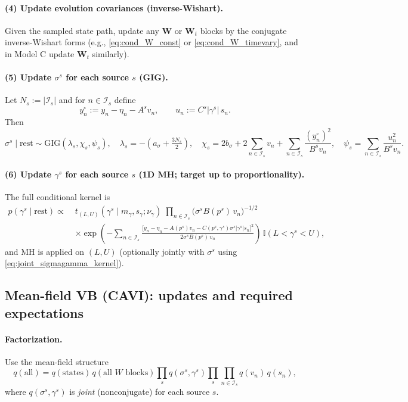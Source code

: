 \documentclass[11pt]{article}
\newcommand{\1}{\mathbb{I}}
\newcommand{\GIG}{\mathrm{GIG}}
\begin{document}
\paragraph{(4) Update evolution covariances (inverse-Wishart).}
Given the sampled state path, update any $\bm W$ or $\bm W_t$ blocks by the conjugate inverse-Wishart forms
(e.g., \eqref{eq:cond_W_const} or \eqref{eq:cond_W_timevary}, and in Model C update $\bm W_t$ similarly).

\paragraph{(5) Update $\sigma^s$ for each source $s$ (GIG).}
Let $N_s:=|\mathcal{I}_s|$ and for $n\in\mathcal{I}_s$ define
\[
y_n^\circ := y_n - \eta_n - A^s v_n,
\qquad
u_n := C^s|\gamma^s|\,s_n.
\]
Then
\begin{equation}
\sigma^s\mid \text{rest} \sim \GIG(\lambda_s,\chi_s,\psi_s),
\quad
\lambda_s=-(a_\sigma+\tfrac{3N_s}{2}),
\quad
\chi_s=2b_\sigma+2\sum_{n\in\mathcal{I}_s} v_n+\sum_{n\in\mathcal{I}_s}\frac{(y_n^\circ)^2}{B^s v_n},
\quad
\psi_s=\sum_{n\in\mathcal{I}_s}\frac{u_n^2}{B^s v_n}.
\label{eq:gibbs_sigma_alg}
\end{equation}

\paragraph{(6) Update $\gamma^s$ for each source $s$ (1D MH; target up to proportionality).}
The full conditional kernel is
\begin{align}
p(\gamma^s\mid \text{rest})
\propto\;&
t_{(L,U)}(\gamma^s\mid m_\gamma,s_\gamma;\nu_\gamma)\;
\prod_{n\in\mathcal{I}_s}\Big(\sigma^s B(p^s)\,v_n\Big)^{-1/2}\nonumber\\
&\times
\exp\!\left(
-\sum_{n\in\mathcal{I}_s}
\frac{\big[y_n-\eta_n-A(p^s)v_n-C(p^s,\gamma^s)\sigma^s|\gamma^s|s_n\big]^2}{2\sigma^s B(p^s)\,v_n}
\right)\,\1(L<\gamma^s<U),
\label{eq:gibbs_gamma_alg}
\end{align}
and MH is applied on $(L,U)$ (optionally jointly with $\sigma^s$ using \eqref{eq:joint_sigmagamma_kernel}).

\subsection{Mean-field VB (CAVI): updates and required expectations}

\paragraph{Factorization.}
Use the mean-field structure
\[
q(\text{all}) = q(\text{states})\,q(\text{all }W\text{ blocks})
\prod_s q(\sigma^s,\gamma^s)\prod_s\prod_{n\in\mathcal{I}_s} q(v_n)\,q(s_n),
\]
where $q(\sigma^s,\gamma^s)$ is \emph{joint} (nonconjugate) for each source $s$.
\end{document}

